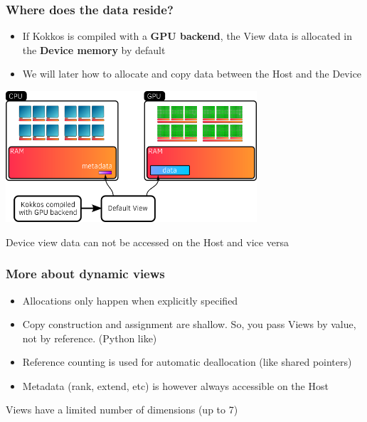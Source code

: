 \documentclass[aspectratio=169]{beamer}
\begin{document}

\begin{frame}[fragile]
    \frametitle{Where does the data reside?}

    \begin{itemize}
        \item If Kokkos is compiled with a \textbf{GPU backend}, the View data is allocated in the \textbf{Device memory} by default
        \item We will later how to allocate and copy data between the Host and the Device
    \end{itemize}

\centering
\includegraphics[width=0.7\textwidth]{../../images/device_view_memory.png}

\begin{alertblock}{}
    Device view data can not be accessed on the Host and vice versa
\end{alertblock} 

\end{frame} 


\begin{frame}[fragile]
    \frametitle{More about dynamic views}

\begin{itemize}
    \item Allocations only happen when explicitly specified
    \item Copy construction and assignment are shallow. So, you pass Views by value, not by reference. (Python like)
    \item Reference counting is used for automatic deallocation (like shared pointers)
    \item Metadata (rank, extend, etc) is however always accessible on the Host
\end{itemize}

\begin{alertblock}{}
    Views have a limited number of dimensions (up to 7)
\end{alertblock}

\end{frame} 
\end{document}
